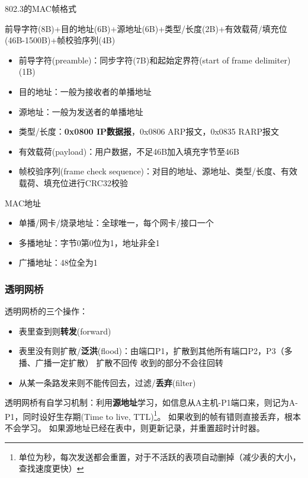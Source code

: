 802.3的MAC帧格式
\begin{center}
前导字符(8B)+目的地址(6B)+源地址(6B)+类型/长度(2B)+有效载荷/填充位(46B-1500B)+帧校验序列(4B)
\end{center}
\begin{itemize}
\item 前导字符(preamble)：同步字符(7B)和起始定界符(start of frame delimiter)(1B)
\item 目的地址：一般为接收者的单播地址
\item 源地址：一般为发送者的单播地址
\item 类型/长度：\textbf{0x0800 IP数据报}，0x0806 ARP报文，0x0835 RARP报文
\item 有效载荷(payload)：用户数据，不足46B加入填充字节至46B
\item 帧校验序列(frame check sequence)：对目的地址、源地址、类型/长度、有效载荷、填充位进行CRC32校验
\end{itemize}

MAC地址
\begin{itemize}
	\item 单播/网卡/烧录地址：全球唯一，每个网卡/接口一个
	\item 多播地址：字节0第0位为1，地址非全1
	\item 广播地址：48位全为1
\end{itemize}

\subsubsection{透明网桥}
透明网桥的三个操作：
\begin{itemize}
	\item 表里查到则\textbf{转发}(forward)
	\item 表里没有则扩散/\textbf{泛洪}(flood)：由端口P1，扩散到其他所有端口P2，P3（多播、广播一定扩散）
	扩散不回传
	收到的部分不会往回转
	\item 从某一条路发来则不能传回去，过滤/\textbf{丢弃}(filter)
\end{itemize}

透明网桥有自学习机制：利用\textbf{源地址}学习，如信息从A主机-P1端口来，则记为A-P1，同时设好生存期(Time to live, TTL)\footnote{单位为秒，每次发送都会重置，对于不活跃的表项自动删掉（减少表的大小，查找速度更快）}。
如果收到的帧有错则直接丢弃，根本不会学习。
如果源地址已经在表中，则更新记录，并重置超时计时器。

